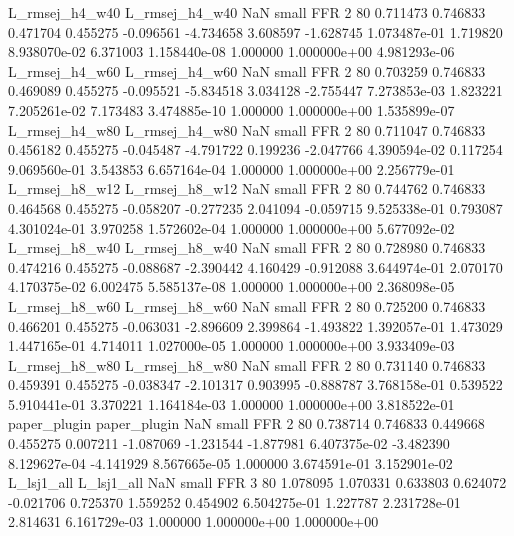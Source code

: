 L_rmsej_h4_w40 L_rmsej_h4_w40                   NaN      small      FFR                 2 80 0.711473       0.746833 0.471704       0.455275   -0.096561     -4.734658      3.608597    -1.628745   1.073487e-01  1.719820 8.938070e-02     6.371003   1.158440e-08            1.000000    1.000000e+00        4.981293e-06
L_rmsej_h4_w60 L_rmsej_h4_w60                   NaN      small      FFR                 2 80 0.703259       0.746833 0.469089       0.455275   -0.095521     -5.834518      3.034128    -2.755447   7.273853e-03  1.823221 7.205261e-02     7.173483   3.474885e-10            1.000000    1.000000e+00        1.535899e-07
L_rmsej_h4_w80 L_rmsej_h4_w80                   NaN      small      FFR                 2 80 0.711047       0.746833 0.456182       0.455275   -0.045487     -4.791722      0.199236    -2.047766   4.390594e-02  0.117254 9.069560e-01     3.543853   6.657164e-04            1.000000    1.000000e+00        2.256779e-01
L_rmsej_h8_w12 L_rmsej_h8_w12                   NaN      small      FFR                 2 80 0.744762       0.746833 0.464568       0.455275   -0.058207     -0.277235      2.041094    -0.059715   9.525338e-01  0.793087 4.301024e-01     3.970258   1.572602e-04            1.000000    1.000000e+00        5.677092e-02
L_rmsej_h8_w40 L_rmsej_h8_w40                   NaN      small      FFR                 2 80 0.728980       0.746833 0.474216       0.455275   -0.088687     -2.390442      4.160429    -0.912088   3.644974e-01  2.070170 4.170375e-02     6.002475   5.585137e-08            1.000000    1.000000e+00        2.368098e-05
L_rmsej_h8_w60 L_rmsej_h8_w60                   NaN      small      FFR                 2 80 0.725200       0.746833 0.466201       0.455275   -0.063031     -2.896609      2.399864    -1.493822   1.392057e-01  1.473029 1.447165e-01     4.714011   1.027000e-05            1.000000    1.000000e+00        3.933409e-03
L_rmsej_h8_w80 L_rmsej_h8_w80                   NaN      small      FFR                 2 80 0.731140       0.746833 0.459391       0.455275   -0.038347     -2.101317      0.903995    -0.888787   3.768158e-01  0.539522 5.910441e-01     3.370221   1.164184e-03            1.000000    1.000000e+00        3.818522e-01
  paper_plugin   paper_plugin                   NaN      small      FFR                 2 80 0.738714       0.746833 0.449668       0.455275    0.007211     -1.087069     -1.231544    -1.877981   6.407375e-02 -3.482390 8.129627e-04    -4.141929   8.567665e-05            1.000000    3.674591e-01        3.152901e-02
    L_lsj1_all     L_lsj1_all                   NaN      small      FFR                 3 80 1.078095       1.070331 0.633803       0.624072   -0.021706      0.725370      1.559252     0.454902   6.504275e-01  1.227787 2.231728e-01     2.814631   6.161729e-03            1.000000    1.000000e+00        1.000000e+00
